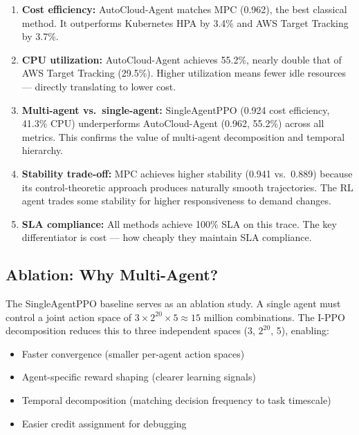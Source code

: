 \documentclass[12pt,a4paper]{article}
\begin{document}
\begin{enumerate}
  \item \textbf{Cost efficiency:} AutoCloud-Agent matches MPC (0.962), the best
        classical method. It outperforms Kubernetes HPA by 3.4\% and AWS Target
        Tracking by 3.7\%.

  \item \textbf{CPU utilization:} AutoCloud-Agent achieves 55.2\%, nearly
        double that of AWS Target Tracking (29.5\%). Higher utilization means
        fewer idle resources --- directly translating to lower cost.

  \item \textbf{Multi-agent vs.\ single-agent:} SingleAgentPPO (0.924 cost
        efficiency, 41.3\% CPU) underperforms AutoCloud-Agent (0.962, 55.2\%)
        across all metrics. This confirms the value of multi-agent
        decomposition and temporal hierarchy.

  \item \textbf{Stability trade-off:} MPC achieves higher stability (0.941 vs.\
        0.889) because its control-theoretic approach produces naturally smooth
        trajectories. The RL agent trades some stability for higher
        responsiveness to demand changes.

  \item \textbf{SLA compliance:} All methods achieve 100\% SLA on this trace.
        The key differentiator is cost --- how cheaply they maintain SLA
        compliance.
\end{enumerate}

\subsection{Ablation: Why Multi-Agent?}

The SingleAgentPPO baseline serves as an ablation study. A single agent must
control a joint action space of $3 \times 2^{20} \times 5 \approx 15$ million
combinations. The I-PPO decomposition reduces this to three independent spaces
(3, $2^{20}$, 5), enabling:
\begin{itemize}
  \item Faster convergence (smaller per-agent action spaces)
  \item Agent-specific reward shaping (clearer learning signals)
  \item Temporal decomposition (matching decision frequency to task timescale)
  \item Easier credit assignment for debugging
\end{itemize}
\end{document}
